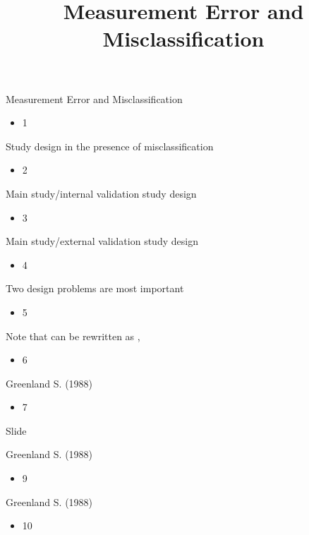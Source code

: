 \documentclass{beamer}
\title{Measurement Error and Misclassification}
\author{}
\date{}
\begin{document}
\frame{\titlepage}
\begin{frame}{Measurement Error and Misclassification}
\begin{itemize}
\item 1
\end{itemize}
\end{frame}
\begin{frame}{Study design in the presence of misclassification}
\begin{itemize}
\item 2
\end{itemize}
\end{frame}
\begin{frame}{Main study/internal validation study design  }
\begin{itemize}
\item 3
\end{itemize}
\end{frame}
\begin{frame}{Main study/external validation study design  }
\begin{itemize}
\item 4
\end{itemize}
\end{frame}
\begin{frame}{Two design problems are most important}
\begin{itemize}
\item 5
\end{itemize}
\end{frame}
\begin{frame}{Note that                  can be rewritten as             , }
\begin{itemize}
\item 6
\end{itemize}
\end{frame}
\begin{frame}{Greenland S. (1988)}
\begin{itemize}
\item 7
\end{itemize}
\end{frame}
\begin{frame}{Slide}
\end{frame}
\begin{frame}{Greenland S. (1988)}
\begin{itemize}
\item 9
\end{itemize}
\end{frame}
\begin{frame}{Greenland S. (1988)}
\begin{itemize}
\item 10
\end{itemize}
\end{frame}
\end{document}
